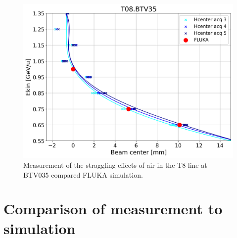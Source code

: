 \documentclass[a4paper,
               biblatex,     %
               ]{jacow}
\begin{document}
\begin{figure}[!htb]
   \centering
   \includegraphics*[width=0.9\columnwidth]{straggling_effects.png}
   \caption{Measurement of the straggling effects of air in the T8 line at BTV035 compared FLUKA simulation.}
   \label{fig:straggling_effects}
\end{figure}




\section{Comparison of measurement to simulation}


\end{document}
